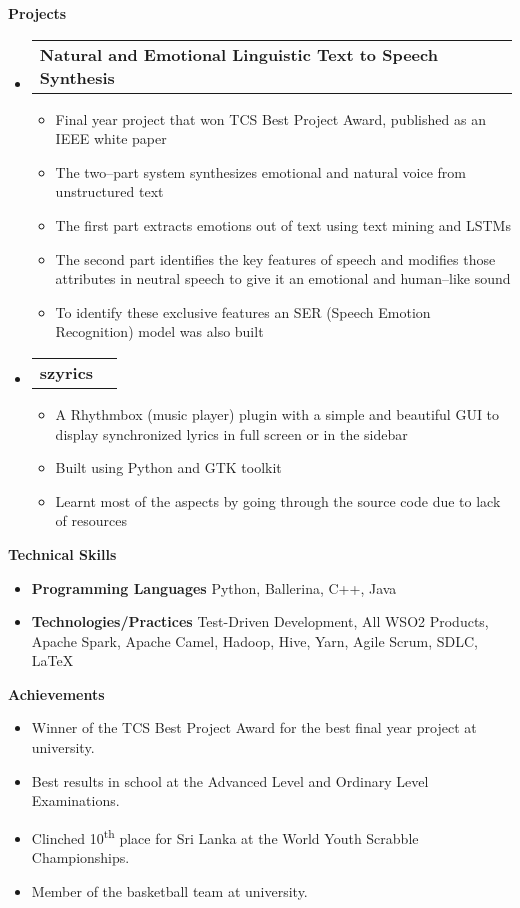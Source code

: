 \documentclass[letterpaper,12pt]{article}[leftmargin=*]
\makeatletter
\def \entryspacing {-0pt}
\renewcommand{\section}[2]{\vspace{5pt}
  \colorbox{secondary}{\color{white}\raggedbottom\normalsize\textbf{{#1}{\hspace{7pt}#2}}}
}
\newcommand{\resumeEntryStart}{\begin{itemize}[leftmargin=2.5mm]}
\newcommand{\resumeEntryEnd}{\end{itemize}\vspace{\entryspacing}}
\newcommand{\resumeItemListStart}{\begin{itemize}[leftmargin=4.5mm]}
\newcommand{\resumeItemListEnd}{\end{itemize}}
\newcommand{\resumeItem}[1]{
  \item\small{
    {#1 \vspace{-2pt}}
  }
}
\newcommand{\resumeEntryTD}[2]{
  \vspace{-1pt}\item[]
    \begin{tabularx}{0.97\textwidth}{X@{\hspace{60pt}}r}
      \textbf{\color{primary}#1} & {\firabook\color{accent}\small#2} \\
    \end{tabularx}\vspace{-6pt}
}
\newcommand{\resumeEntryS}[2]{
  \item[]\small{
    \textbf{\color{primary}#1 }{ #2 \vspace{-6pt}}
  }
}
\makeatother
\begin{document}
\section{\faFlask}{Projects}

  \resumeEntryStart
    \resumeEntryTD
      {Natural and Emotional Linguistic Text to Speech Synthesis}{}
    \resumeItemListStart
      \resumeItem {Final year project that won TCS Best Project Award, published as an IEEE white paper}
      \resumeItem {The two--part system synthesizes emotional and natural voice from unstructured text}
      \resumeItem {The first part extracts emotions out of text using text mining and LSTMs}
      \resumeItem {The second part identifies the key features of speech and modifies those attributes in neutral speech to give it an emotional and human--like sound}
      \resumeItem {To identify these exclusive features an SER (Speech Emotion Recognition) model was also built}
    \resumeItemListEnd
  \resumeEntryEnd

  \resumeEntryStart
    \resumeEntryTD
      {szyrics}{}
    \resumeItemListStart
      \resumeItem {A Rhythmbox (music player) plugin with a simple and beautiful GUI to display synchronized lyrics in full screen or in the sidebar}
      \resumeItem {Built using Python and GTK toolkit}
      \resumeItem {Learnt most of the aspects by going through the source code due to lack of resources}
    \resumeItemListEnd
  \resumeEntryEnd

\section{\faStar}{Technical Skills}
 \resumeEntryStart
  \resumeEntryS{Programming Languages} {Python, Ballerina, C++, Java}
  \resumeEntryS{Technologies/Practices} {Test-Driven Development, All WSO2 Products, Apache Spark, Apache Camel, Hadoop, Hive, Yarn, Agile Scrum, SDLC, \LaTeX}
 \resumeEntryEnd
 
\section{\faTrophy}{Achievements}
  \resumeEntryStart
      \resumeItem {Winner of the TCS Best Project Award for the best final year project at university.}
      \resumeItem {Best results in school at the Advanced Level and Ordinary Level Examinations.}
      \resumeItem {Clinched 10\textsuperscript{th} place for Sri Lanka at the World Youth Scrabble Championships.}
      \resumeItem {Member of the basketball team at university.}
 \resumeEntryEnd
\end{document}

